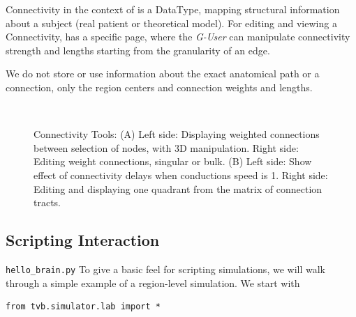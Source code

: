 Connectivity in the context of \TVB is a DataType, mapping structural information about a subject (real patient or theoretical model).
For editing and viewing a Connectivity, \TVB has a specific page, where the \emph{G-User} can manipulate connectivity strength and lengths 
starting from the granularity of an edge.

We do not store or use information about the exact anatomical path or a connection, only the region centers and connection weights and lengths.

 \begin{figure}[!htbp]
 	\centering
	\\
	\caption{Connectivity Tools: 
	(A) Left side: Displaying weighted connections between selection of nodes, with 3D manipulation.
	Right side: Editing weight connections, singular or bulk.
	(B) Left side: Show effect of connectivity delays when conductions speed is 1.
	Right side: Editing and displaying one quadrant from the matrix of connection tracts.}
        \label{fig:connectivity}
\end{figure}



\subsection{Scripting Interaction}

\texttt{hello\_brain.py}
To give a basic feel for scripting \TVB simulations, we will 
walk through a simple example of a region-level simulation. We 
start with

\begin{lstlisting}
from tvb.simulator.lab import *
\end{lstlisting}

